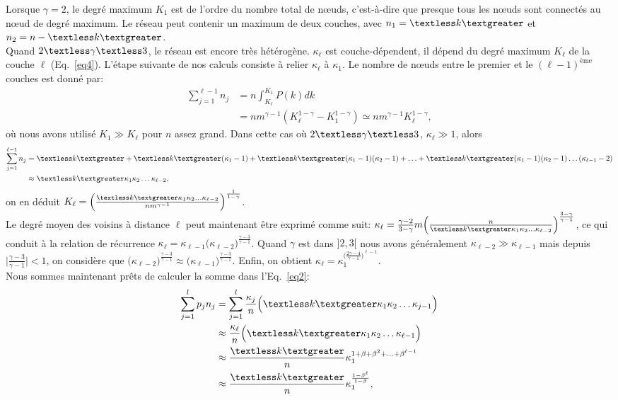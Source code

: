 Lorsque $\gamma=2$, le degré maximum $K_1$ est de l'ordre du nombre total de nœuds, c'est-à-dire que presque tous les nœuds sont connectés au nœud de degré maximum. Le réseau peut contenir un maximum de deux couches, avec $n_1=\km$ et $n_2=n-\km $. \\
Quand $2\textless \gamma \textless 3$, le réseau est encore très hétérogène. $\kappa_{\ell} $ est couche-dépendent, il dépend du degré maximum $K_{\ell} $ de la couche $\ell$ (Eq.~\ref{eq4}). L'étape suivante de nos calculs consiste à relier $\kappa_{\ell}$ à $\kappa_1$. Le nombre de nœuds entre le premier et le $(\ell-1)^{\text{ème}}$ couches est donné par:
\begin{align}
\sum_{j=1}^{\ell-1}n_j&=n\int_{K_{\ell}}^{K_1} P(k)dk \nonumber \\
&=nm^{\gamma-1}(K_{\ell}^{1-\gamma}-K_1^{1-\gamma})\simeq nm^{\gamma-1} K_{\ell}^{1-\gamma},
\label{eq5}
\end{align}
où nous avons utilisé $K_1\gg K_{\ell}$ pour $n$ assez grand. Dans cette cas où $2\textless \gamma \textless 3$, $\kappa_{\ell}\gg 1$, alors
\begin{align}
\sum_{j=1}^{\ell-1}n_j&=\km+\km(\kappa_1-1)+\km(\kappa_1-1)(\kappa_2-1)+\ldots+\km(\kappa_1-1)(\kappa_2-1)\ldots(\kappa_{\ell-1}-2)\nonumber \\
&\approx\km\kappa_1\kappa_2\ldots\kappa_{\ell-2},
\label{eq6}
\end{align}
on en déduit
$K_{\ell}=\Big(\frac{\km\kappa_1\kappa_2\ldots\kappa_{\ell-2}}{nm^{\gamma-1}}\Big)^{\frac{1}{1-\gamma}}$.\\
Le degré moyen des voisins à distance $\ell $ peut maintenant être exprimé comme suit:
$\kappa_{\ell}=\frac{\gamma-2}{3-\gamma}m\Big(\frac{n}{\km\kappa_1\kappa_2\ldots\kappa_{\ell-2}}\Big)^{\frac{3-\gamma}{\gamma-1}}$, ce qui conduit à la relation de récurrence $\kappa_{\ell}=\kappa_{\ell-1}
\Big(\kappa_{\ell-2}\Big)^{\frac{\gamma-3}{\gamma-1}}$.  Quand $\gamma$ est dans $]2,3[$ nous avons généralement
$\kappa_{\ell-2} \gg \kappa_{\ell-1}$  mais depuis $\mid\frac{\gamma-3}{\gamma-1}\mid<1$, on considère que $\Big(\kappa_{\ell-2}\Big)^{\frac{\gamma-3}{\gamma-1}}\approx
\Big(\kappa_{\ell-1}\Big)^{\frac{\gamma-3}{\gamma-1}}$. Enfin, on obtient $\kappa_{\ell}=\kappa_1^{\Big(\frac{2\gamma-4}{\gamma-1}\Big)^{\ell-1}}$.\\
Nous sommes maintenant prêts de calculer la somme dans l'Eq.~\ref{eq2}:
\begin{align}
\sum_{j=1}^{l} p_jn_j&=\sum_{j=1}^{l}\frac{\kappa_j}{n}\Big(\km\kappa_1\kappa_2\ldots\kappa_{j-1}\Big) \nonumber\\ 
&\approx \frac{\kappa_{\ell}}{n}\Big(\km\kappa_1\kappa_2\ldots\kappa_{\ell-1}\Big) \nonumber \\
&\approx \frac{\km}{n}\kappa_1^{1+\beta+\beta^2+\ldots+\beta^{\ell-1}} \nonumber \\
&\approx \frac{\km}{n}\kappa_1^{\frac{1-\beta^{\ell}}{1-\beta}},
\label{eq7}
\end{align}
